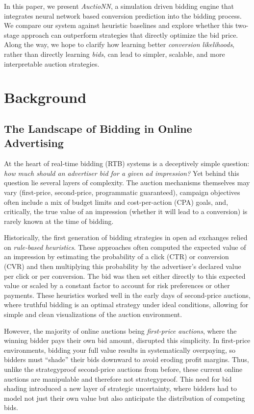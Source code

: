 \documentclass[11pt]{article}
\begin{document}
In this paper, we present \emph{AuctioNN}, a simulation driven bidding engine that integrates neural network based conversion prediction into the bidding process. We compare our system against heuristic baselines and explore whether this two-stage approach can outperform strategies that directly optimize the bid price. Along the way, we hope to clarify how learning better \emph{conversion likelihoods}, rather than directly learning \emph{bids}, can lead to simpler, scalable, and more interpretable auction strategies.


\section{Background}

\subsection{The Landscape of Bidding in Online Advertising}


At the heart of real-time bidding (RTB) systems is a deceptively simple question: \emph{how much should an advertiser bid for a given ad impression?} Yet behind this question lie several layers of complexity. The auction mechanisms themselves may vary (first-price, second-price, programmatic guaranteed), campaign objectives often include a mix of budget limits and cost-per-action (CPA) goals, and, critically, the true value of an impression (whether it will lead to a conversion) is rarely known at the time of bidding.

Historically, the first generation of bidding strategies in open ad exchanges relied on \emph{rule-based heuristics}. These approaches often computed the expected value of an impression by estimating the probability of a click (CTR) or conversion (CVR) and then multiplying this probability by the advertiser’s declared value per click or per conversion. The bid was then set either directly to this expected value or scaled by a constant factor to account for risk preferences or other payments. These heuristics worked well in the early days of second-price auctions, where truthful bidding is an optimal strategy under ideal conditions, allowing for simple and clean visualizations of the auction environment. 

However, the majority of online auctions being  \emph{first-price auctions}, where the winning bidder pays their own bid amount, disrupted this simplicity. In first-price environments, bidding your full value results in systematically overpaying, so bidders must ``shade'' their bids downward to avoid eroding profit margins. Thus, unlike the strategyproof second-price auctions from before, these current online auctions are manipulable and therefore not strategyproof. This need for bid shading introduced a new layer of strategic uncertainty, where bidders had to model not just their own value but also anticipate the distribution of competing bids.
\end{document}
